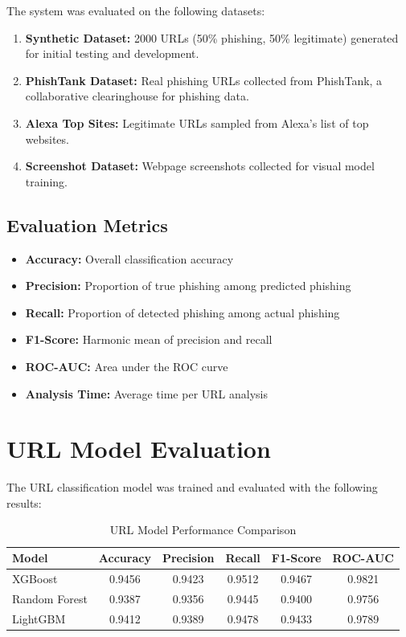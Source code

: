 \documentclass[12pt,a4paper]{report}
\begin{document}
The system was evaluated on the following datasets:

\begin{enumerate}
    \item \textbf{Synthetic Dataset:} 2000 URLs (50\% phishing, 50\% legitimate) generated for initial testing and development.
    
    \item \textbf{PhishTank Dataset:} Real phishing URLs collected from PhishTank, a collaborative clearinghouse for phishing data.
    
    \item \textbf{Alexa Top Sites:} Legitimate URLs sampled from Alexa's list of top websites.
    
    \item \textbf{Screenshot Dataset:} Webpage screenshots collected for visual model training.
\end{enumerate}

\subsection{Evaluation Metrics}

\begin{itemize}
    \item \textbf{Accuracy:} Overall classification accuracy
    \item \textbf{Precision:} Proportion of true phishing among predicted phishing
    \item \textbf{Recall:} Proportion of detected phishing among actual phishing
    \item \textbf{F1-Score:} Harmonic mean of precision and recall
    \item \textbf{ROC-AUC:} Area under the ROC curve
    \item \textbf{Analysis Time:} Average time per URL analysis
\end{itemize}

\section{URL Model Evaluation}

The URL classification model was trained and evaluated with the following results:

\begin{table}[h!]
\centering
\caption{URL Model Performance Comparison}
\label{tab:url_results}
\begin{tabular}{|l|c|c|c|c|c|}
\hline
\textbf{Model} & \textbf{Accuracy} & \textbf{Precision} & \textbf{Recall} & \textbf{F1-Score} & \textbf{ROC-AUC} \\
\hline
XGBoost & 0.9456 & 0.9423 & 0.9512 & 0.9467 & 0.9821 \\
Random Forest & 0.9387 & 0.9356 & 0.9445 & 0.9400 & 0.9756 \\
LightGBM & 0.9412 & 0.9389 & 0.9478 & 0.9433 & 0.9789 \\
\hline
\end{tabular}
\end{table}
\end{document}
